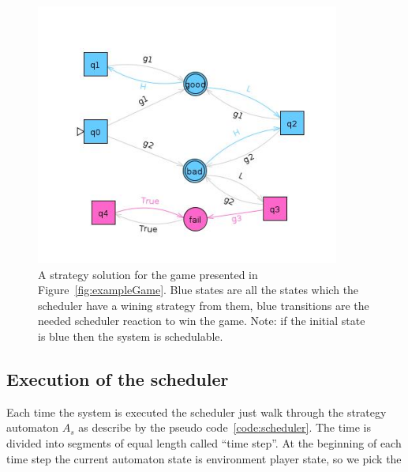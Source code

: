 \documentclass[ twoside, 12pt ]{article}
\begin{document}
\begin{figure} %
    \centerline{\includegraphics[width=100mm]{gameExampleSolved.jpg}}
    \caption{A strategy solution for the game presented in Figure~\ref{fig:exampleGame}.
        Blue states are all the states which the scheduler have a wining strategy from them, blue transitions are the needed scheduler reaction to win the game.
        Note: if the initial state is blue then the system is schedulable.}
    \label{fig:exampleGameStrategy}
\end{figure}

\subsection{Execution of the scheduler}

Each time the system is executed the scheduler just walk through the strategy automaton $A_s$ as describe by the pseudo code~\ref{code:scheduler}. 
The time is divided into segments of equal length called ``time step''.
At the beginning of each time step the current automaton state is environment player state, so we pick the 
\end{document}
